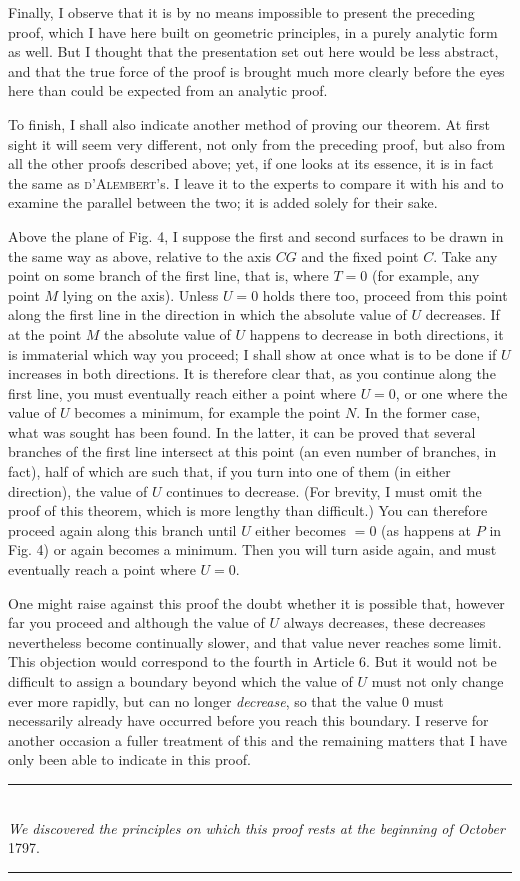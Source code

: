 Finally, I observe that it is by no means impossible to present the preceding proof, which I have here built on geometric principles, in a purely analytic form as well. But I thought that the presentation set out here would be less abstract, and that the true force of the proof is brought much more clearly before the eyes here than could be expected from an analytic proof.

To finish, I shall also indicate another method of proving our theorem. At first sight it will seem very different, not only from the preceding proof, but also from all the other proofs described above; yet, if one looks at its essence, it is in fact the same as \textsc{d'Alembert}'s. I leave it to the experts to compare it with his and to examine the parallel between the two; it is added solely for their sake.

 Above the plane of Fig. 4, I suppose the first and second surfaces to be drawn in the same way as above, relative to the axis $CG$ and the fixed point $C$. Take any point on some branch of the first line, that is, where $T=0$ (for example, any point $M$ lying on the axis). Unless $U=0$ holds there too, proceed from this point along the first line in the direction in which the absolute
 value of $U$ decreases. If at the point $M$ the absolute value of $U$ happens to decrease in both directions, it is immaterial which way you proceed; I shall show at once what is to be done if $U$ increases in both directions. It is therefore clear that, as you continue along the first line, you must eventually reach either a point where $U=0$, or one where the value of $U$ becomes a minimum, for example the point $N$. In the former case, what was sought has been found. In the latter, it can be proved that several branches of the first line intersect at this point (an even number of branches, in fact), half of which are such that, if you turn into one of them (in either direction), the value of $U$ continues to decrease. (For brevity, I must omit the proof of this theorem, which is more lengthy than difficult.) You can therefore proceed again along this branch until $U$ either becomes $=0$ (as happens at $P$ in Fig. 4) or again becomes a minimum. Then you will turn aside again, and must eventually reach a point where $U=0$.

One might raise against this proof the doubt whether it is possible that, however far you proceed and although the value of $U$ always decreases, these decreases nevertheless become continually slower, and that value never reaches some limit. This objection would correspond to the fourth in Article 6. But it would not be difficult to assign a boundary beyond which the value of $U$ must not only change ever more rapidly, but can no longer \textit{decrease}, so that the value 0 must necessarily already have occurred before you reach this boundary. I reserve for another occasion a fuller treatment of this and the remaining matters that I have only been able to indicate in this proof.

\begin{center}
\rule{8cm}{0.3pt}\\[8pt]
\textit{We discovered the principles on which this proof rests at the beginning of October} 1797.\\[8pt]
\rule{5cm}{0.3pt}
\end{center}
